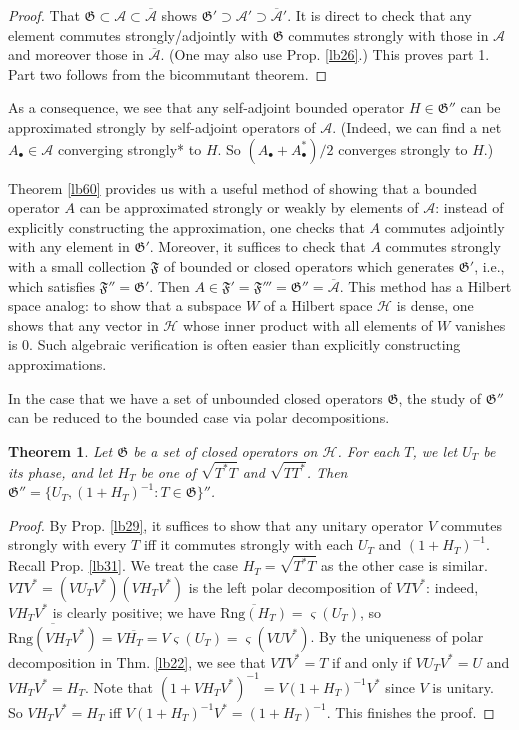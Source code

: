 \documentclass[12pt,b5paper,notitlepage]{article}
\theoremstyle{definition}
\theoremstyle{plain}
\newtheorem{thm}[df]{Theorem}
\newcommand{\fk}{\mathfrak}
\newcommand{\mc}{\mathcal}
\newcommand{\ovl}{\overline}
\newcommand{\sgm}{\varsigma}
\newcommand{\blt}{\bullet}
\newcommand{\Rng}{\mathrm{Rng}}
\numberwithin{equation}{section}
\begin{document}
\begin{proof}
That $\fk G\subset\mc A\subset\ovl{\mc A}$ shows $\fk G'\supset\mc A'\supset\ovl{\mc A}'$. It is direct to check that any element commutes strongly/adjointly with $\fk G$ commutes strongly with those in $\mc A$ and moreover those in $\ovl{\mc A}$. (One may also use Prop. \ref{lb26}.)	This proves part 1. Part two follows from the bicommutant theorem.
\end{proof}


As a consequence, we see that any self-adjoint bounded operator $H\in\fk G''$ can be approximated strongly by self-adjoint operators of $\mc A$. (Indeed, we can find a net $A_\blt\in\mc A$ converging strongly* to $H$. So $(A_\blt+A^*_\blt)/2$ converges strongly to $H$.)


Theorem \ref{lb60} provides us with a useful method of showing that a bounded operator $A$ can be approximated strongly or weakly by elements of $\mc A$: instead of explicitly constructing the approximation, one checks that $A$ commutes adjointly with any element in $\fk G'$. Moreover, it suffices to check that $A$ commutes strongly with a small collection $\fk F$ of bounded or closed operators  which generates $\fk G'$, i.e., which satisfies $\fk F''=\fk G'$. Then $A\in \fk F'=\fk F'''=\fk G''=\ovl{\mc A}$. This method has a Hilbert space analog: to show that a subspace $W$ of a Hilbert space $\mc H$ is dense, one shows that any vector in $\mc H$ whose inner product with all elements of $W$ vanishes is $0$. Such algebraic verification is often easier than explicitly constructing approximations.


In the case that we have a set of unbounded closed operators $\fk G$, the study of $\fk G''$ can be reduced to the bounded case via polar decompositions.

\begin{thm}\label{lb30}
Let $\fk G$ be a set of closed operators on $\mc H$. For each $T$, we let $U_T$ be its phase, and let $H_T$ be one of $\sqrt{T^*T}$ and $\sqrt{TT^*}$. Then $\fk G''=\{U_T,(1+H_T)^{-1}:T\in\fk G\}''$.
\end{thm}

\begin{proof}
By Prop. \ref{lb29}, it suffices to show that any unitary operator $V$ commutes strongly with every $T$ iff it commutes strongly with each $U_T$ and $(1+H_T)^{-1}$. Recall Prop. \ref{lb31}. We treat the case  $H_T=\sqrt{T^*T}$ as the other case is similar. $VTV^*=(VU_TV^*)(VH_TV^*)$ is the left polar decomposition of $VTV^*$: indeed, $VH_TV^*$ is clearly positive; we have $\ovl{\Rng(H_T)}=\sgm(U_T)$, so $\ovl{\Rng(VH_TV^*)}=V\ovl{H_T}=V\sgm(U_T)=\sgm(VUV^*)$. By the uniqueness of polar decomposition in Thm. \ref{lb22}, we see that $VTV^*=T$ if and only if $VU_TV^*=U$ and $VH_TV^*=H_T$. Note that $(1+VH_TV^*)^{-1}=V(1+H_T)^{-1}V^*$ since $V$ is unitary. So $VH_TV^*=H_T$ iff $V(1+H_T)^{-1}V^*=(1+H_T)^{-1}$. This finishes the proof.
\end{proof}
\end{document}
